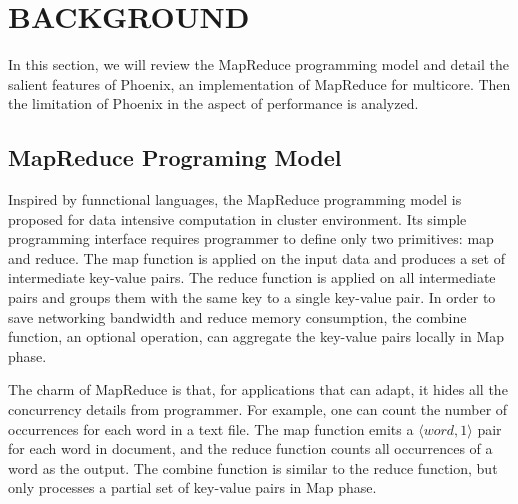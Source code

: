 \section{BACKGROUND}
\label{sec:back}
In this section, we will review the MapReduce programming
model and detail the salient features of Phoenix, 
an implementation of MapReduce for multicore.
Then the limitation of Phoenix in the aspect of performance is analyzed.

\subsection{MapReduce Programing Model}
Inspired  by funnctional languages, the MapReduce programming model is proposed for data intensive computation in cluster environment.
Its simple programming interface requires programmer to  define only two primitives: map and reduce.
The map function is applied on the input data and produces a set of intermediate key-value pairs.
The reduce function is applied on all intermediate pairs and  groups them with the same key to a single key-value pair. 
In order to save networking bandwidth and reduce memory consumption, the combine function, an optional operation, can aggregate the key-value pairs locally in Map phase.


The charm of MapReduce is that, for applications that can adapt, it hides all the concurrency details from  programmer. 
For example, one can count the number of occurrences for each word in a text file. 
The map function emits a $\langle word, 1\rangle$ pair for each word in document, and the reduce function counts all occurrences of a word as the output. 
The combine function is similar to the reduce function, but only processes a partial set of key-value pairs in Map phase.


